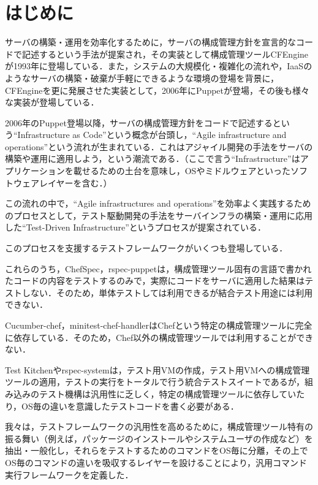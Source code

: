 \section{はじめに}

サーバの構築・運用を効率化するために，サーバの構成管理方針を宣言的なコードで記述するという手法が提案され，その実装として構成管理ツールCFEngine\cite{cfengine}が1993年に登場している．また，システムの大規模化・複雑化の流れや，IaaSのようなサーバの構築・破棄が手軽にできるような環境の登場を背景に，CFEngineを更に発展させた実装として，2006年にPuppet\cite{puppet}が登場，その後も様々な実装が登場している\cite{chef}\cite{saltstack}\cite{ansible}．

2006年のPuppet登場以降，サーバの構成管理方針をコードで記述するという``Infrastructure as Code''という概念が台頭し，``Agile infrastructure and operations''\cite{agile infrastructure}という流れが生まれている．これはアジャイル開発の手法をサーバの構築や運用に適用しよう，という潮流である．（ここで言う``Infrastructure''はアプリケーションを載せるための土台を意味し，OSやミドルウェアといったソフトウェアレイヤーを含む．）

この流れの中で，``Agile infrastructures and operations''を効率よく実践するためのプロセスとして，テスト駆動開発の手法をサーバインフラの構築・運用に応用した``Test-Driven Infrastructure''\cite{test driven infrastructure with chef}というプロセスが提案されている．

このプロセスを支援するテストフレームワークがいくつも登場している\cite{chefspec}\cite{rspec-puppet}\cite{cucumber-chef}\cite{minitest-chef-handler}\cite{test kitchen}\cite{rspec-system}．

これらのうち，ChefSpec，rspec-puppetは，構成管理ツール固有の言語で書かれたコードの内容をテストするのみで，実際にコードをサーバに適用した結果はテストしない．そのため，単体テストしては利用できるが結合テスト用途には利用できない．

Cucumber-chef，minitest-chef-handlerはChefという特定の構成管理ツールに完全に依存している．そのため，Chef以外の構成管理ツールでは利用することができない．

Test Kitchenやrspec-systemは，テスト用VMの作成，テスト用VMへの構成管理ツールの適用，テストの実行をトータルで行う統合テストスイートであるが，組み込みのテスト機構は汎用性に乏しく，特定の構成管理ツールに依存していたり，OS毎の違いを意識したテストコードを書く必要がある．

我々は，テストフレームワークの汎用性を高めるために，構成管理ツール特有の振る舞い（例えば，パッケージのインストールやシステムユーザの作成など）を抽出・一般化し，それらをテストするためのコマンドをOS毎に分離，その上でOS毎のコマンドの違いを吸収するレイヤーを設けることにより，汎用コマンド実行フレームワークを定義した．

